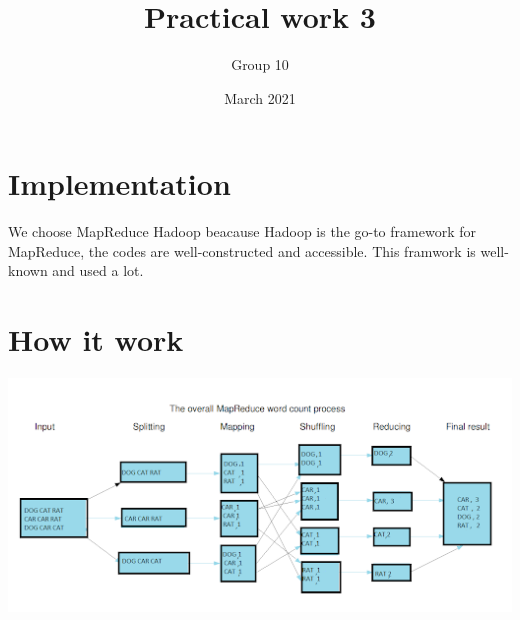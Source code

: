 \documentclass{article}
\title{Practical work 3}
\author{Group 10}
\date{March 2021}
\begin{document}
\maketitle

\section{Implementation}
We choose MapReduce Hadoop beacause Hadoop is the go-to framework for MapReduce, the codes are well-constructed and accessible. This framwork is well-known and used a lot.
\section{How it work}
\includegraphics[scale = 0.7]{mapreduce.png}
\end{document}
